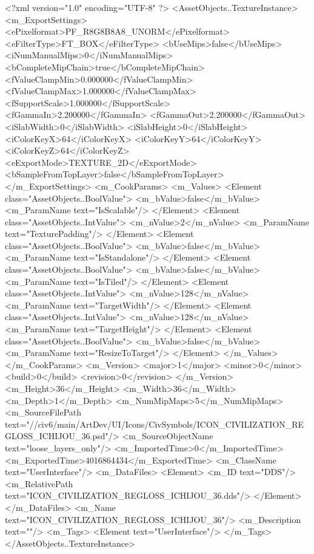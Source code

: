 <?xml version="1.0" encoding="UTF-8" ?>
<AssetObjects..TextureInstance>
	<m_ExportSettings>
		<ePixelformat>PF_R8G8B8A8_UNORM</ePixelformat>
		<eFilterType>FT_BOX</eFilterType>
		<bUseMips>false</bUseMips>
		<iNumManualMips>0</iNumManualMips>
		<bCompleteMipChain>true</bCompleteMipChain>
		<fValueClampMin>0.000000</fValueClampMin>
		<fValueClampMax>1.000000</fValueClampMax>
		<fSupportScale>1.000000</fSupportScale>
		<fGammaIn>2.200000</fGammaIn>
		<fGammaOut>2.200000</fGammaOut>
		<iSlabWidth>0</iSlabWidth>
		<iSlabHeight>0</iSlabHeight>
		<iColorKeyX>64</iColorKeyX>
		<iColorKeyY>64</iColorKeyY>
		<iColorKeyZ>64</iColorKeyZ>
		<eExportMode>TEXTURE_2D</eExportMode>
		<bSampleFromTopLayer>false</bSampleFromTopLayer>
	</m_ExportSettings>
	<m_CookParams>
		<m_Values>
			<Element class="AssetObjects..BoolValue">
				<m_bValue>false</m_bValue>
				<m_ParamName text="IsScalable"/>
			</Element>
			<Element class="AssetObjects..IntValue">
				<m_nValue>2</m_nValue>
				<m_ParamName text="TexturePadding"/>
			</Element>
			<Element class="AssetObjects..BoolValue">
				<m_bValue>false</m_bValue>
				<m_ParamName text="IsStandalone"/>
			</Element>
			<Element class="AssetObjects..BoolValue">
				<m_bValue>false</m_bValue>
				<m_ParamName text="IsTiled"/>
			</Element>
			<Element class="AssetObjects..IntValue">
				<m_nValue>128</m_nValue>
				<m_ParamName text="TargetWidth"/>
			</Element>
			<Element class="AssetObjects..IntValue">
				<m_nValue>128</m_nValue>
				<m_ParamName text="TargetHeight"/>
			</Element>
			<Element class="AssetObjects..BoolValue">
				<m_bValue>false</m_bValue>
				<m_ParamName text="ResizeToTarget"/>
			</Element>
		</m_Values>
	</m_CookParams>
	<m_Version>
		<major>1</major>
		<minor>0</minor>
		<build>0</build>
		<revision>0</revision>
	</m_Version>
	<m_Height>36</m_Height>
	<m_Width>36</m_Width>
	<m_Depth>1</m_Depth>
	<m_NumMipMaps>5</m_NumMipMaps>
	<m_SourceFilePath text="//civ6/main/ArtDev/UI/Icons/CivSymbols/ICON_CIVILIZATION_REGLOSS_ICHIJOU_36.psd"/>
	<m_SourceObjectName text="loose_layers_only"/>
	<m_ImportedTime>0</m_ImportedTime>
	<m_ExportedTime>4016864434</m_ExportedTime>
	<m_ClassName text="UserInterface"/>
	<m_DataFiles>
		<Element>
			<m_ID text="DDS"/>
			<m_RelativePath text="ICON_CIVILIZATION_REGLOSS_ICHIJOU_36.dds"/>
		</Element>
	</m_DataFiles>
	<m_Name text="ICON_CIVILIZATION_REGLOSS_ICHIJOU_36"/>
	<m_Description text=""/>
	<m_Tags>
		<Element text="UserInterface"/>
	</m_Tags>
</AssetObjects..TextureInstance>

